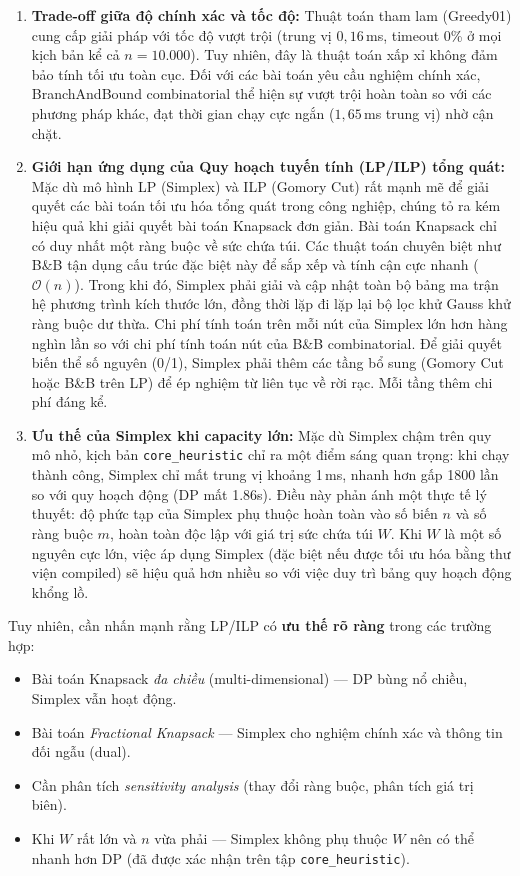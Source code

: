\documentclass[fontsize=13pt,a4paper]{report}
\begin{document}
\begin{enumerate}[leftmargin=*]
    \item \textbf{Trade-off giữa độ chính xác và tốc độ:}
    Thuật toán tham lam (Greedy01) cung cấp giải pháp với tốc độ vượt trội (trung vị $0,16$\,ms, timeout 0\% ở mọi kịch bản kể cả $n=10.000$). Tuy nhiên, đây là thuật toán xấp xỉ không đảm bảo tính tối ưu toàn cục. Đối với các bài toán yêu cầu nghiệm chính xác, BranchAndBound combinatorial thể hiện sự vượt trội hoàn toàn so với các phương pháp khác, đạt thời gian chạy cực ngắn ($1,65$\,ms trung vị) nhờ cận chặt.
    
    \item \textbf{Giới hạn ứng dụng của Quy hoạch tuyến tính (LP/ILP) tổng quát:}
    Mặc dù mô hình LP (Simplex) và ILP (Gomory Cut) rất mạnh mẽ để giải quyết các bài toán tối ưu hóa tổng quát trong công nghiệp, chúng tỏ ra kém hiệu quả khi giải quyết bài toán Knapsack đơn giản. Bài toán Knapsack chỉ có duy nhất một ràng buộc về sức chứa túi. Các thuật toán chuyên biệt như B\&B tận dụng cấu trúc đặc biệt này để sắp xếp và tính cận cực nhanh ($\mathcal{O}(n)$). Trong khi đó, Simplex phải giải và cập nhật toàn bộ bảng ma trận hệ phương trình kích thước lớn, đồng thời lặp đi lặp lại bộ lọc khử Gauss khử ràng buộc dư thừa. Chi phí tính toán trên mỗi nút của Simplex lớn hơn hàng nghìn lần so với chi phí tính toán nút của B\&B combinatorial. Để giải quyết biến thể số nguyên (0/1), Simplex phải thêm các tầng bổ sung (Gomory Cut hoặc B\&B trên LP) để ép nghiệm từ liên tục về rời rạc. Mỗi tầng thêm chi phí đáng kể.
    
    \item \textbf{Ưu thế của Simplex khi capacity lớn:}
    Mặc dù Simplex chậm trên quy mô nhỏ, kịch bản \texttt{core\_heuristic} chỉ ra một điểm sáng quan trọng: khi chạy thành công, Simplex chỉ mất trung vị khoảng 1\,ms, nhanh hơn gấp 1800 lần so với quy hoạch động (DP mất 1.86s). Điều này phản ánh một thực tế lý thuyết: độ phức tạp của Simplex phụ thuộc hoàn toàn vào số biến $n$ và số ràng buộc $m$, hoàn toàn độc lập với giá trị sức chứa túi $W$. Khi $W$ là một số nguyên cực lớn, việc áp dụng Simplex (đặc biệt nếu được tối ưu hóa bằng thư viện compiled) sẽ hiệu quả hơn nhiều so với việc duy trì bảng quy hoạch động khổng lồ.
\end{enumerate}

Tuy nhiên, cần nhấn mạnh rằng LP/ILP có \textbf{ưu thế rõ ràng} trong các trường hợp:
\begin{itemize}[leftmargin=*]
    \item Bài toán Knapsack \textit{đa chiều} (multi-dimensional) --- DP bùng nổ chiều, Simplex vẫn hoạt động.
    \item Bài toán \textit{Fractional Knapsack} --- Simplex cho nghiệm chính xác và thông tin đối ngẫu (dual).
    \item Cần phân tích \textit{sensitivity analysis} (thay đổi ràng buộc, phân tích giá trị biên).
    \item Khi $W$ rất lớn và $n$ vừa phải --- Simplex không phụ thuộc $W$ nên có thể nhanh hơn DP (đã được xác nhận trên tập \texttt{core\_heuristic}).
\end{itemize}
\end{document}
